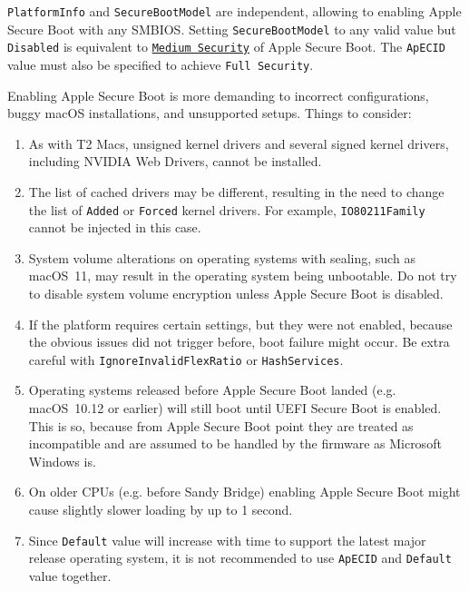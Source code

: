 \documentclass[]{article}
\providecommand{\tightlist}{%
  \setlength{\itemsep}{0pt}\setlength{\parskip}{0pt}}
\begin{document}
\begin{enumerate}
  \texttt{PlatformInfo} and \texttt{SecureBootModel} are independent,
  allowing to enabling Apple Secure Boot with any SMBIOS. Setting
  \texttt{SecureBootModel} to any valid value but \texttt{Disabled} is equivalent to
  \href{https://support.apple.com/en-us/HT208330}{\texttt{Medium Security}}
  of Apple Secure Boot. The \texttt{ApECID} value must also be specified to
  achieve \texttt{Full Security}.

  Enabling Apple Secure Boot is more demanding to incorrect configurations,
  buggy macOS installations, and unsupported setups. Things to consider:

  \begin{enumerate}
    \tightlist
    \item As with T2 Macs, unsigned kernel drivers and several signed kernel
    drivers, including NVIDIA Web Drivers, cannot be installed.
    \item The list of cached drivers may be different, resulting in the need
      to change the list of \texttt{Added} or \texttt{Forced} kernel drivers.
      For example, \texttt{IO80211Family} cannot be injected in this case.
    \item System volume alterations on operating systems with sealing, such as
      macOS~11, may result in the operating system being unbootable. Do not
      try to disable system volume encryption unless Apple Secure Boot is disabled.
    \item If the platform requires certain settings, but they were not enabled,
      because the obvious issues did not trigger before, boot failure might occur.
      Be extra careful with \texttt{IgnoreInvalidFlexRatio} or \texttt{HashServices}.
    \item Operating systems released before Apple Secure Boot landed (e.g.
      macOS~10.12 or earlier) will still boot until UEFI Secure Boot is enabled.
      This is so, because from Apple Secure Boot point they are treated as incompatible
      and are assumed to be handled by the firmware as Microsoft Windows is.
    \item On older CPUs (e.g. before Sandy Bridge) enabling Apple Secure Boot
      might cause slightly slower loading by up to 1 second.
    \item Since \texttt{Default} value will increase with time to support the latest
      major release operating system, it is not recommended to use \texttt{ApECID}
      and \texttt{Default} value together.
  \end{enumerate}


\end{enumerate}
\end{document}
